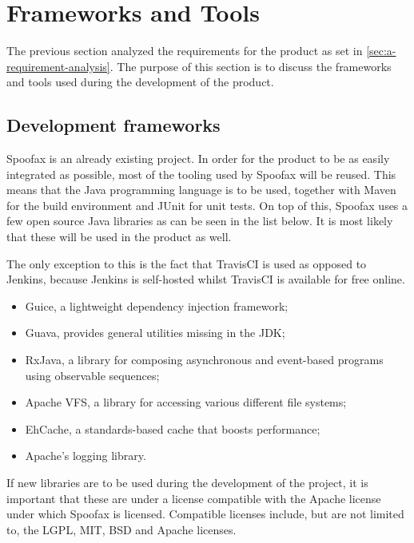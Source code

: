 \section{Frameworks and Tools}
\label{sec:a-realisation-product}

The previous section analyzed the requirements for the product as set in
\cref{sec:a-requirement-analysis}. The purpose of this section is to discuss the
frameworks and tools used during the development of the product.

\subsection{Development frameworks}
\label{ssec:a-frameworks}

Spoofax is an already existing project. In order for the product to be as easily
integrated as possible, most of the tooling used by Spoofax will be reused. This
means that the Java programming language is to be used, together with Maven for
the build environment and JUnit for unit tests. On top of this, Spoofax uses a
few open source Java libraries as can be seen in the list below. It is most
likely that these will be used in the product as well.

The only exception to this is the fact that TravisCI is used as opposed to
Jenkins, because Jenkins is self-hosted whilst TravisCI is available for free
online.

\begin{itemize}
  \item Guice, a lightweight dependency injection framework;
  \item Guava, provides general utilities missing in the JDK;
  \item RxJava, a library for composing asynchronous and event-based programs
    using observable sequences;
  \item Apache VFS, a library for accessing various different file systems;
  \item EhCache, a standards-based cache that boosts performance;
  \item Apache's logging library.
\end{itemize}

If new libraries are to be used during the development of the project, it is
important that these are under a license compatible with the Apache license
under which Spoofax is licensed. Compatible licenses include, but are not
limited to, the LGPL, MIT, BSD and Apache licenses.

